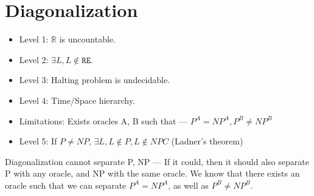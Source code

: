 \chapter{Diagonalization}

\begin{itemize}
    \item Level 1: $\mathbb{R}$ is uncountable.
    \item Level 2: $\exists L, L \notin \texttt{RE}$.
    \item Level 3: Halting problem is undecidable.
    \item Level 4: Time/Space hierarchy. 
    \item Limitations: Exists oracles A,  B such that --- $P^A = {NP}^A, P^B \neq {NP}^B$
    \item Level 5: If $P \neq NP$, $\exists L, L \notin P, L \notin NPC$ (Ladner's theorem)
\end{itemize}

Diagonalization cannot separate P, NP ---
If it could, then it should also separate P with any oracle, and NP with the
same oracle.  We know that there exists an oracle such that we can separate 
$P^A = NP^A$, as well as $P^B \neq NP^B$.
